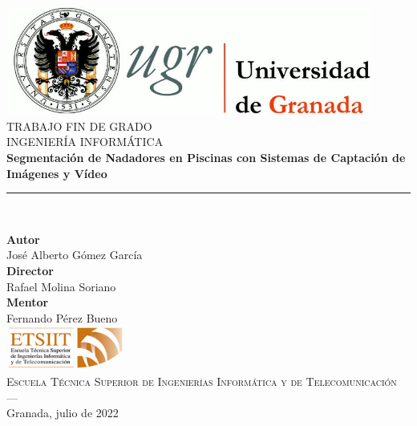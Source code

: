 \begin{titlepage}
 
\newlength{\centeroffset}
\setlength{\centeroffset}{-0.5\oddsidemargin}
\addtolength{\centeroffset}{0.5\evensidemargin}
\thispagestyle{empty}

\noindent\hspace*{\centeroffset}\begin{minipage}{\textwidth}

\centering
\includegraphics[width=0.9\textwidth]{imagenes/logo_ugr.jpg}\\[1.4cm]

\textsc{ \Large TRABAJO FIN DE GRADO\\[0.2cm]}
\textsc{ INGENIERÍA INFORMÁTICA}\\[1cm]


{\huge\bfseries Segmentación de Nadadores en Piscinas con Sistemas de Captación de Imágenes y Vídeo\\}
\noindent\rule[-1ex]{\textwidth}{3pt}\\[3ex]
\end{minipage}

\vspace{1.5cm}
\noindent\hspace*{\centeroffset}\begin{minipage}{\textwidth}
\centering

\textbf{Autor}\\ {José Alberto Gómez García}\\[2.5ex]
\textbf{Director}\\
{Rafael Molina Soriano}\\[2.5ex]
\textbf{Mentor}\\
{Fernando Pérez Bueno}\\[1cm]

\includegraphics[width=0.3\textwidth]{imagenes/etsiit_logo.png}\\[0.1cm]
\textsc{Escuela Técnica Superior de Ingenierías Informática y de Telecomunicación}\\
\textsc{---}\\
Granada, julio de 2022
\end{minipage}

\end{titlepage}
